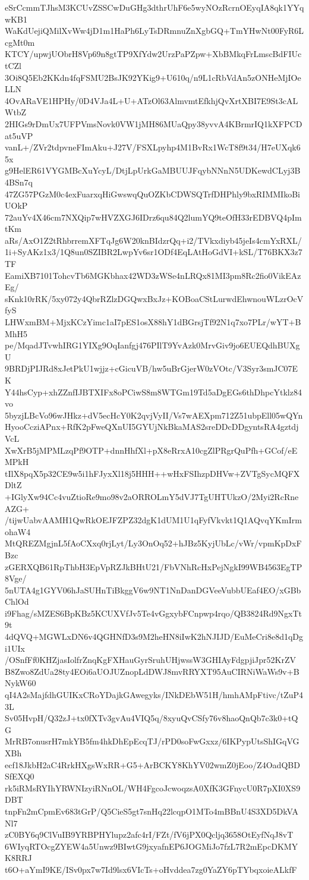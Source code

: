 eSrCcmmTJhsM3KCUvZSSCwDuGHg3dthrUhF6e5wyNOzRcrnOEyqIA8qk1YYqwKB1
WaKdUejiQMilXvWw4jD1m1HaPh6LyTsDRmnuZnXgbGQ+TmYHwNt00FyR6LcgMt0m
KTCY/upwjUObrH8Vp69n8gtTP9XfYdw2UrzPaPZpw+XbBMkqFrLmscBdFIUctCZl
3Oi8Q5Eb2KKdn4fqFSMU2BsJK92YKig9+U610q/n9L1cRbVdAn5zONHeMjIOeLLN
4OvARaVE1HPHy/0D4VJa4L+U+ATzOl63AlmvmtEfkhjQvXrtXBI7E9St3cALWtbZ
2HIGs9rDmUx7UFPVmsNovk0VW1jMH86MUaQpy38yvvA4KBrmrIQ1kXFPCDat5uVP
vanL+/ZVr2tdpvneFImAku+J27V/FSXLpyhp4M1BvRx1WcT8f9t34/H7eUXqk65x
g9HelER61VYGMBcXuYcyL/DtjLpUrkGaMBUUJFqybNNnN5UDKewdCLyj3B4BSn7q
47ZG57PGzM0c4exFuarxqHiGwswqQuOZKbCDWSQTrfDHPhly9bxRIMMIkoBiUOkP
72auYv4X46cm7NXQip7wHVZXGJ6IDrz6qu84Q2lumYQ9teOfH33rEDBVQ4pImtKm
aRs/AxO1Z2tRhbrremXFTqJg6W20knBIdzrQq+i2/TVkxdiyb45jeIs4cmYxRXL/
1i+SyAKz1x3/1Q8un0SZIBR2LwpYv6sr1ODf4EqLAtHoGdVI+kSL/T76BKX3z7TF
EamiXB7101TohcvTb6MGKbhax42WD3zWSe4nLRQx81MI3pm8Rc2fio0VikEAzEg/
sKnk10rRK/5xy072y4QbrRZlzDGQwxBxJz+KOBoaCStLurwdEhwnouWLzrOcVfyS
LHWxmBM+MjxKCzYimc1aI7pES1osX88hY1dBGrsjTf92N1q7xo7PLr/wYT+BMhH5
pe/MqadJTvwhIRG1YIXg9OqIanfgj476PIlT9YvAzk0MrvGiv9jo6EUEQdhBUXgU
9BRDjPIJRd8xJetPkU1wjjz+cGicuVB/hw5uBrGjerW0zVOtc/V3Syr3smJC07EK
Y44hsCyp+xhZZnfIJBTXIFx8oPCiwS8m8WTGm19Td5aDgEGs6thDhpcYtklz84vo
5byzjLBcVo96wJHkz+dV5ecHcY0K2qvjVyII/Vs7wAEXpm712Z51ubpEll05wQYn
HyooCcziAPnx+RfK2pFweQXnUI5GYUjNkBkaMAS2sreDDcDDgyntsRA4gztdjVcL
XwXrB5jMPMLzqPf9OTP+dnnHhfXl+pX8eRrxA10cgZlPRgrQuPfh+GCof/eEMPkH
tIlX8pqX5p32CE9w5i1hFJyxXl18j5HHH++wHxFSIhzpDHVw+ZVTgSycMQFXDltZ
+IGlyXw94Cc4vuZtioRe9mo98v2aORROLmY5dVJ7TgUHTUkzO/2Myi2RcRneAZG+
/tijwUabvAAMH1QwRkOEJFZPZ32dgK1dUM1U1qFyfVkvkt1Q1AQvqYKmIrmohaW4
MtQREZMgjnL5fAoCXxq0rjLyt/Ly3OnOq52+hJBz5KyjUbLc/vWr/vpmKpDxFBzc
zGERXQB61RpThbH3EpVpRZJkBHtU21/FbVNhRcHxPejNgkI99WB4563EgTP8Vge/
5nUTA4g1GYV06hJaSUHnTiBkggV6w9NT1NnDanDGVeeVubbUEaf4EO/xGBbChlOd
i9Fhag/sMZES6BpKBz5KCUXVfJv5Te4vGgxybFCnpwp4rqo/QB3824Rd9NgxTt9t
4dQVQ+MGWLxDN6v4QGHNfD3s9M2heHN8iIwK2hNJIJD/EuMeCri8e8d1qDgi1UIx
/OSnfFf0KHZjasIolfrZnqKgFXHauGyrSruhUHjwssW3GHIAyFdgpjiJpr52KrZV
B8Zwo8ZdUa28ty4EOi6aUOJUZnopLdDWJ8mvRRYXT95AuCIRNiWaWs9v+BNykW60
qI4A2sMajfdhGUIKxCRoYDajkGAwegyks/INkDEbW51H/hmhAMpFtivc/tZuP43L
Sv05HvpH/Q32zJ+tx0fXTv3gvAu4VIQ5q/8xyuQvCSfy76v8haoQnQb7c3k0+tQG
MrRB7onusrH7mkYB5fm4hkDhEpEcqTJ/rPD0soFwGxxz/6IKPypUtsShIGqVGXBh
ecf18JkbH2aC4RrkHXgsWxRR+G5+ArBCKY8KhYV02wmZ0jEoo/Z4OadQBDSfEXQ0
rk5iRMsRYIhYRWNIzyiRNnOL/WH4FgcoJcwoqzsA0XfK3GFnycU0R7pXI0XS9DBT
tnpFn2mCpmEv683tGrP/Q5CieS5gt7snHq22lcqpO1MTo4mBBnU4S3XD5DkVANl7
zC0BY6q9ClVuIB9YRBPHYlupz2afc4rI/FZt/fV6jPX0Qcljq3658OtEyfNqJ8vT
6WIyqRTOcgZYEW4a5Unwz9BIwtG9jxyafnEP6JOGMiJo7fzL7R2mEpcDKMYK8RRJ
t6O+aYmI9KE/ISv0px7w7Id9lsx6VIcTs+oHvddea7zg0YaZY6pTYbqxoieALkfF

